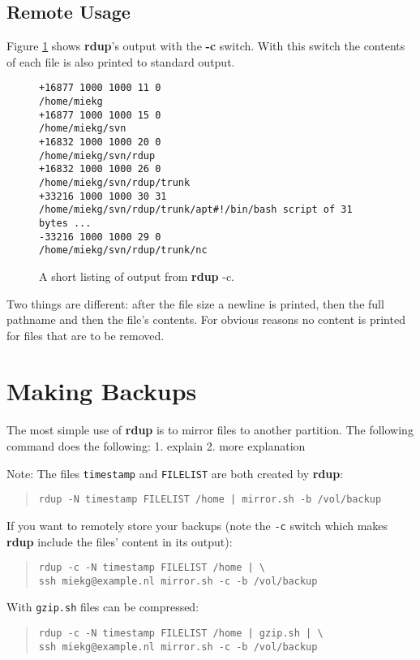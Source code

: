 \documentclass[a4paper, openany]{memoir}
\newcommand{\rdup}{\textbf{rdup}}
\newcommand{\cmd}[1]{\texttt{#1}}
\begin{document}
\section{Remote Usage}
Figure \ref{fig:rdup -c output} shows \rdup's output with the
\textbf{-c} switch. With this switch the contents of each file is also
printed to standard output.

\begin{figure}[hbt]
\begin{verbatim}
+16877 1000 1000 11 0 
/home/miekg
+16877 1000 1000 15 0 
/home/miekg/svn
+16832 1000 1000 20 0 
/home/miekg/svn/rdup
+16832 1000 1000 26 0 
/home/miekg/svn/rdup/trunk
+33216 1000 1000 30 31 
/home/miekg/svn/rdup/trunk/apt#!/bin/bash script of 31 bytes ...
-33216 1000 1000 29 0 
/home/miekg/svn/rdup/trunk/nc
\end{verbatim}
\caption{A short listing of output from \rdup{} -c.}
\label{fig:rdup -c output}
\end{figure}

Two things are different: after the file size a newline is printed, then
the full pathname and then the file's contents.  For obvious reasons no
content is printed for files that are to be removed.

\chapter{Making Backups}
The most simple use of \rdup{} is to mirror files to
another partition. The following command does the following:
1. explain
2. more explanation

Note: The files \cmd{timestamp} and \cmd{FILELIST} are
both created by \rdup:
\begin{quote}
\begin{verbatim}
rdup -N timestamp FILELIST /home | mirror.sh -b /vol/backup
\end{verbatim}
\end{quote}

\noindent If you want to remotely store your backups (note the \cmd{-c} switch which makes
\rdup{} include the files' content in its output):
\begin{quote}
\begin{verbatim}
rdup -c -N timestamp FILELIST /home | \
ssh miekg@example.nl mirror.sh -c -b /vol/backup
\end{verbatim}
\end{quote}

\noindent With \cmd{gzip.sh} files can be compressed:
\begin{quote}
\begin{verbatim}
rdup -c -N timestamp FILELIST /home | gzip.sh | \
ssh miekg@example.nl mirror.sh -c -b /vol/backup
\end{verbatim}
\end{quote}
\end{document}
